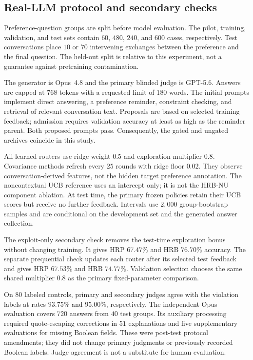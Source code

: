 \documentclass{article} %
\begin{document}
\subsection{Real-LLM protocol and secondary checks}

Preference-question groups are split before model evaluation.
The pilot, training, validation, and test sets contain $60$, $480$, $240$,
and $600$ cases, respectively. Test conversations place $10$ or $70$
intervening exchanges between the preference and the final question.
The held-out split is relative to this experiment, not a guarantee against
pretraining contamination.

The generator is Opus~4.8 and the primary blinded judge is GPT-5.6.
Answers are capped at $768$ tokens with a requested limit of $180$ words.
The initial prompts implement direct answering, a preference reminder,
constraint checking, and retrieval of relevant conversation text.
Proposals are based on selected training feedback; admission requires
validation accuracy at least as high as the reminder parent.
Both proposed prompts pass. Consequently, the gated and ungated archives
coincide in this study.

All learned routers use ridge weight $0.5$ and exploration multiplier
$0.8$. Covariance methods refresh every $25$ rounds with ridge floor
$0.02$. They observe conversation-derived features, not the hidden target
preference annotation. The noncontextual UCB reference uses an intercept
only; it is not the HRB-NU component ablation.
At test time, the primary frozen policies retain their UCB scores but
receive no further feedback. Intervals use $2{,}000$ group-bootstrap
samples and are conditional on the development set and the generated
answer collection.

The exploit-only secondary check removes the test-time exploration bonus
without changing training. It gives HRP $67.47\%$ and HRB $76.70\%$
accuracy. The separate prequential check updates each router after its
selected test feedback and gives HRP $67.53\%$ and HRB $74.77\%$.
Validation selection chooses the same shared multiplier $0.8$ as the
primary fixed-parameter comparison.

On $80$ labeled controls, primary and secondary judges agree with the
violation labels at rates $93.75\%$ and $95.00\%$, respectively.
The independent Opus evaluation covers $720$ answers from $40$ test groups.
Its auxiliary processing required quote-escaping corrections in $51$
explanations and five supplementary evaluations for missing Boolean
fields. These were post-test protocol amendments; they did not change
primary judgments or previously recorded Boolean labels. Judge agreement
is not a substitute for human evaluation.
\end{document}
